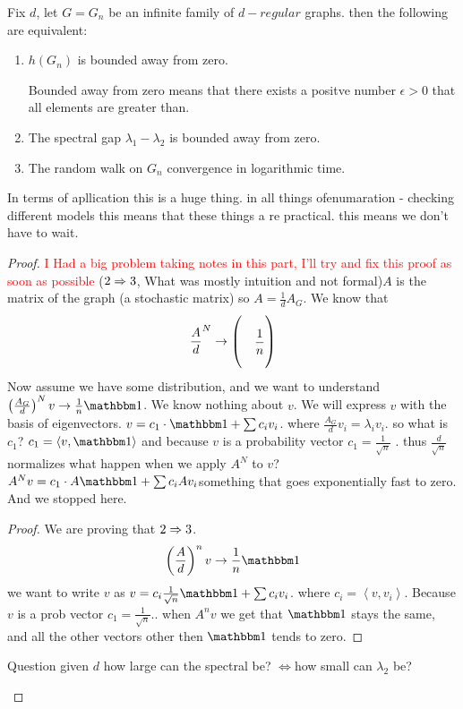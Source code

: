 \begin{thm}
Fix $d$, let $G=G_{n}$ be an infinite family of $d-regular$ graphs.
then the following are equivalent:
\begin{enumerate}
\item $h\left(G_{n}\right)$ is bounded away from zero. %
\begin{insight}
    Bounded away from zero means that there exists a positve number $\epsilon>0$ that all elements are greater than.
\end{insight}
\item The spectral gap $\lambda_{1}-\lambda_{2}$ is bounded away from zero. 
\item The random walk on $G_{n}$ convergence in logarithmic time.
\end{enumerate}
\begin{insight}
In terms of apllication this is a huge thing. in all things ofenumaration
- checking different models this means that these things a re practical.
this means we don't have to wait.%
\end{insight}
\begin{proof}
\textcolor{red}{I Had a big problem taking notes in this part, I'll
try and fix this proof as soon as possible} ($2\Rightarrow3$, What was
mostly intuition and not formal)$A$ is the matrix of the graph (a
stochastic matrix) so $A=\frac{1}{d}A_{G}$. We know that 
\[
\frac{A}{d}^{N}\to\text{\ensuremath{\begin{pmatrix}\\
 & \frac{1}{n}\\
\\
\end{pmatrix}}}
\]
Now assume we have some distribution, and we want to understand $\left(\frac{A_{G}}{d}\right)^{N}v\to\frac{1}{n}\one$.
We know nothing about $v$. We will express $v$ with the basis of
eigenvectors. $v=c_{1}\cdot\one+\sum c_{i}v_{i}$. where $\frac{A_{G}}{d}v_{i}=\lambda_{i}v_{i}$.
so what is $c_{1}$? $c_{1}=\left\langle v,\one\right\rangle $ and
because $v$ is a probability vector $c_{1}=\frac{1}{\sqrt{n}}$ .
thus $\frac{d}{\sqrt{n}}$ normalizes what happen when we apply $A^{N}$
to $v$? $A^{N}v=c_{1}\cdot A\one+\sum c_{i}Av_{i}$something that
goes exponentially fast to zero. And we stopped here.%
\begin{insight}
\begin{proof}
We are proving that $2\Rightarrow3$.
\[
\left(\frac{A}{d}\right)^{n}v\to\frac{1}{n}\one
\]
we want to write $v$ as $v=c_{i}\frac{1}{\sqrt{n}}\one+\sum c_{i}v_{i}$.
where $c_{i}=\left\langle v,v_{i}\right\rangle $. Because $v$ is
a prob vector $c_{1}=\frac{1}{\sqrt{n}}..$ when $A^{n}v$ we get
that $\one$ stays the same, and all the other vectors other then
$\one$ tends to zero.
\end{proof}
Question given $d$ how large can the spectral be? $\iff$how small
can $\lambda_{2}$ be?%
\end{insight}
\end{proof}
\end{thm}

